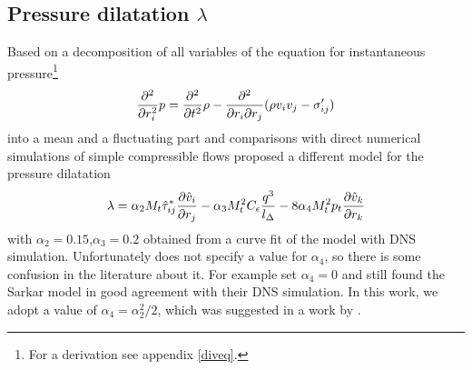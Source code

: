 \subsection{Pressure dilatation \texorpdfstring{$\lambda$}{lambda}}
Based on a decomposition of all variables of the equation for instantaneous
pressure\footnote{For a derivation see appendix \ref{diveq}.} 
\begin{align}
\pdd{r_i} p = \pdd{t}\rho- 
\frac{\partial^2}{\partial r_i \partial r_j}(\rho v_i
v_j-\sigma'_{ij})\label{eq:instpres}
\end{align}
into a mean and a fluctuating part and comparisons with direct numerical
simulations of simple compressible flows \citet{Sarkar1992} proposed a different
model for the pressure dilatation 
\begin{align}
\lambda=\alpha_2 M_t \hat{\tau}^*_{ij} \ppd{r_j}{\hat{v}_i} 
- \alpha_3 M_t^2 C_{\epsilon}\frac{q^3}{l_{\Delta}}
- 8 \alpha_4 M_t^2 p_t \ppd{r_k}{\hat{v}_k}
\end{align}
with $\alpha_2=0.15$,$\alpha_3=0.2$ obtained from a curve fit of the model with
DNS simulation. Unfortunately \citet{Sarkar1992} does not specify a value for
$\alpha_4$, so there is some confusion in the literature about it. For example
\citet{Shyy1997} set $\alpha_4 = 0$ and still found the Sarkar model in good
agreement with their DNS simulation. In this work, we adopt a value of 
$\alpha_4 = \alpha_2^2/2$, which was suggested in a work by
\citet{Schmidt2007a}.

